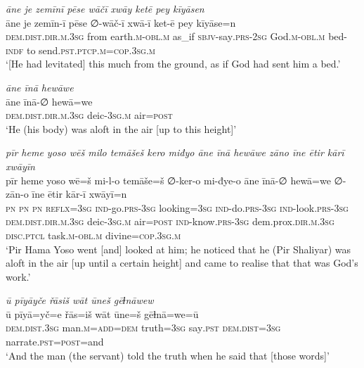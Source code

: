 \ea \label{ŽP.69}
\textit{āne je zemīnī pēse wāčī xwāy ketē pey kīyāsen} \\ 
\gll āne je zemīn-ī pēse ∅-wāč-ī xwā-ī ket-ē pey kīyāse=n \\ 
 \textsc{dem.dist}\textsc{.dir}\textsc{.m}\textsc{.3sg} from earth\textsc{.m}\textsc{-obl}\textsc{.m} as\_if \textsc{sbjv-}say\textsc{.prs-}\textsc{2sg} God\textsc{.m}\textsc{-obl}\textsc{.m} bed\textsc{-indf} to send\textsc{.pst}\textsc{.ptcp}\textsc{.m}\textsc{=cop}\textsc{.3sg}\textsc{.m} \\ 
\glt `[He had levitated] this much from the ground, as if God had sent him a bed.'
\z 
 
\ea \label{ŽP.70}
\textit{āne īnā hewāwe} \\ 
\gll āne īnā-∅ hewā=we \\ 
 \textsc{dem.dist}\textsc{.dir}\textsc{.m}\textsc{.3sg} deic\textsc{-3sg}\textsc{.m} air\textsc{=\textsc{post}} \\ 
\glt `He (his body) was aloft in the air [up to this height]'
\z 
 
\ea \label{ŽP.71}
\textit{pīr heme yoso wēš milo temāšeš kero miđyo āne īnā hewāwe zāno īne ētir kārī xwāyīn} \\ 
\gll pīr heme yoso wē=š mi-l-o temāše=š ∅-ker-o mi-đye-o āne īnā-∅ hewā=we ∅-zān-o īne ētir kār-ī xwāyī=n \\ 
 \textsc{pn} \textsc{pn} \textsc{pn} \textsc{reflx}\textsc{=3sg} \textsc{ind-}go\textsc{.prs}\textsc{-3sg} looking\textsc{=3sg} \textsc{ind-}do\textsc{.prs}\textsc{-3sg} \textsc{ind-}look\textsc{.prs}\textsc{-3sg} \textsc{dem.dist}\textsc{.dir}\textsc{.m}\textsc{.3sg} deic\textsc{-3sg}\textsc{.m} air\textsc{=\textsc{post}} \textsc{ind-}know\textsc{.prs}\textsc{-3sg} dem.prox\textsc{.dir}\textsc{.m}\textsc{.3sg} \textsc{disc.ptcl} task\textsc{.m}\textsc{-obl}\textsc{.m} divine\textsc{=cop}\textsc{.3sg}\textsc{.m} \\ 
\glt `Pir Hama Yoso went [and] looked at him; he noticed that he (Pir Shaliyar) was aloft in the air [up until a certain height] and came to realise that that was God’s work.'
\z 
 
\ea \label{ŽP.77}
\textit{ū pīyāyče řāsiš wāt ūneš gēɫnāwew} \\ 
\gll ū pīyā=yč=e řās=iš wāt ūne=š gēɫnā=we=ū \\ 
 \textsc{dem.dist}\textsc{.3sg} man\textsc{.m}\textsc{=add}\textsc{=dem} truth\textsc{=3sg} say\textsc{.pst} \textsc{dem.dist}\textsc{=3sg} narrate\textsc{.pst}\textsc{=\textsc{post}}=and \\ 
\glt `And the man (the servant) told the truth when he said that [those words]'
\z 
 
